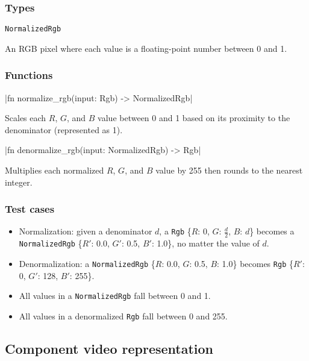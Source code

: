 \documentclass[12pt, letterpaper]{article}
\begin{document}
    \subsubsection{Types}

    \verb|NormalizedRgb|

    An RGB pixel where each value is a floating-point number between 0 and 1.

    \subsubsection{Functions}

    |fn normalize_rgb(input: Rgb) -> NormalizedRgb|

    Scales each $R$, $G$, and $B$ value between 0 and 1 based on its proximity to the denominator (represented as 1).

    |fn denormalize_rgb(input: NormalizedRgb) -> Rgb|

    Multiplies each normalized $R$, $G$, and $B$ value by 255 then rounds to the nearest integer.

    \subsubsection{Test cases}

    \begin{itemize}
        \item Normalization: given a denominator $d$, a \verb|Rgb| \{$R$: 0, $G$: $\frac{d}{2}$, $B$: $d$\} becomes a
        \verb|NormalizedRgb| \{$R'$: 0.0, $G'$: 0.5, $B'$: 1.0\}, no matter the value of $d$.
        \item Denormalization: a \verb|NormalizedRgb| \{$R$: 0.0, $G$: 0.5, $B$: 1.0\} becomes
        \verb|Rgb| \{$R'$: 0, $G'$: 128, $B'$: 255\}.
        \item All values in a \verb|NormalizedRgb| fall between 0 and 1.
        \item All values in a denormalized \verb|Rgb| fall between 0 and 255.
    \end{itemize}

    \subsection{Component video representation}
\end{document}
